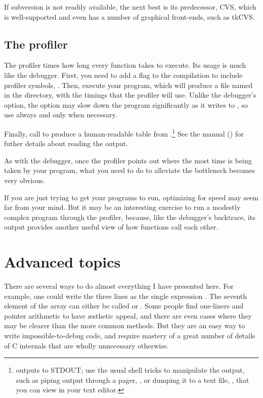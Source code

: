 \documentclass[12pt]{article}
\def\ind#1{\index{#1}#1}
\begin{document}
If subversion is not readily available, the next best is its predecessor,
CVS, which is well-supported and even has a number of graphical
front-ends, such as tkCVS.  

\subsection{The \ind{profiler}} The profiler times how long every function
takes to execute. Its usage is much like the debugger. First, you need
to add a flag to the compilation to include profiler symbols,
. Then, execute your program, which will produce a file named
 in the directory, with the timings that the profiler
will use. Unlike the debugger's  option, the 
option may slow down the program significantly as it writes to
, so use  always and  only
when necessary.

Finally, call  to produce a
human-readable table from .\footnote{
outputs to \ind{STDOUT}; use the usual shell tricks to manipulate
the output, such as piping output through a pager, , or dumping it to a text file, , that you can view in your text editor.}
See the manual () for futher details about reading
the output.

As with the debugger, once the profiler points out where the most time
is being taken by your program, what you need to do to alleviate the
bottleneck becomes very obvious.

If you are just trying to get your programs to run, optimizing for speed 
may seem far from your mind. But it may be an interesting exercise to
run a modestly complex program through the profiler, because, like the
debugger's backtrace, its output provides another useful view of how
functions call each other.

\section{\treesymbol Advanced topics}   
There are several ways to do almost everything I have presented here.  For
example, one could write the three lines  as the single expression . The seventh
element of the array  can either be called  or
.  Some people find one-liners and pointer arithmetic
to have \ae{}sthetic appeal, and there are even cases where they may
be clearer than the more common methods. But they are an easy way to
write impossible-to-debug code, and require mastery of a great number
of details of C internals that are wholly unnecessary otherwise.
\end{document}
